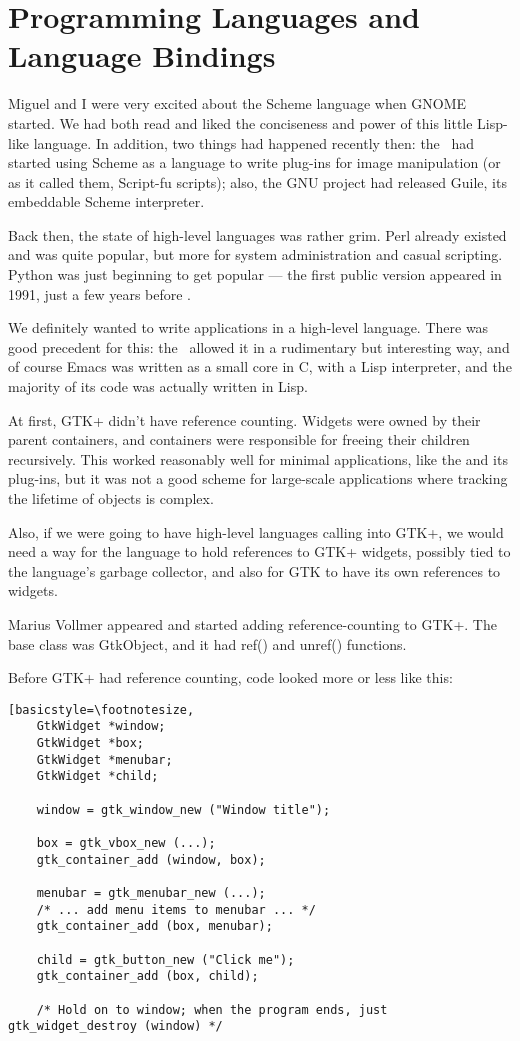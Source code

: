 \chapter{Programming Languages and Language Bindings}

Miguel and I were very excited about the Scheme language when GNOME
started.  We had both read \cite{sicp} and liked the conciseness and
power of this little Lisp-like language.  In addition, two things had
happened recently then:  the \GIMP\ had started using Scheme as a
language to write plug-ins for image manipulation (or as it called
them, Script-fu scripts); also, the GNU project had released Guile,
its embeddable Scheme interpreter.

Back then, the state of high-level languages was rather grim.  Perl
already existed and was quite popular, but more for system
administration and casual scripting.  Python was just beginning to get
popular --- the first public version appeared in 1991, just a few
years before \GNOME.

We definitely wanted to write applications in a high-level language.
There was good precedent for this:  the \GIMP\ allowed it in a
rudimentary but interesting way, and of course Emacs was written as a
small core in C, with a Lisp interpreter, and the majority of its code
was actually written in Lisp.

At first, GTK+ didn't have reference counting.  Widgets were owned by
their parent containers, and containers were responsible for freeing
their children recursively.  This worked reasonably well for minimal
applications, like the \GIMP and its plug-ins, but it was not a good
scheme for large-scale applications where tracking the lifetime of
objects is complex.

Also, if we were going to have high-level languages calling into GTK+,
we would need a way for the language to hold references to GTK+
widgets, possibly tied to the language's garbage collector, and also
for GTK to have its own references to widgets.

Marius Vollmer appeared and started adding reference-counting to
GTK+.  The base class was GtkObject, and it had ref() and unref()
functions.

Before GTK+ had reference counting, code looked more or less like
this:

\begin{lstlisting}[basicstyle=\footnotesize,
    GtkWidget *window;
    GtkWidget *box;
    GtkWidget *menubar;
    GtkWidget *child;

    window = gtk_window_new ("Window title");

    box = gtk_vbox_new (...);
    gtk_container_add (window, box);

    menubar = gtk_menubar_new (...);
    /* ... add menu items to menubar ... */
    gtk_container_add (box, menubar);

    child = gtk_button_new ("Click me");
    gtk_container_add (box, child);

    /* Hold on to window; when the program ends, just gtk_widget_destroy (window) */
\end{lstlisting}

